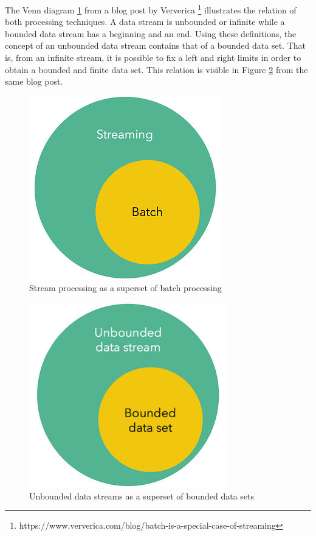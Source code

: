 The Venn diagram \ref{fig:stream-superset} from a blog post by Ververica \footnote{https://www.ververica.com/blog/batch-is-a-special-case-of-streaming} illustrates the relation of both processing techniques. A data stream is unbounded or infinite while a bounded data stream has a beginning and an end. Using these definitions, the concept of an unbounded data stream contains that of a bounded data set. That is, from an infinite stream, it is possible to fix a left and right limits in order to obtain a bounded and finite data set. This relation is visible in Figure \ref{fig:unbounded-bounded-superset} from the same blog post.

\begin{figure}[!htb]
    \begin{center}
      \includegraphics[scale=0.5]{figures/streaming-subset-batch.png}
      \caption{Stream processing as a superset of batch processing}
      \label{fig:stream-superset}
    \end{center}
\end{figure}

\begin{figure}[!htb]
    \begin{center}
      \includegraphics[scale=0.5]{figures/unbounded-superset-bounded.png}
      \caption{Unbounded data streams as a superset of bounded data sets}
      \label{fig:unbounded-bounded-superset}
    \end{center}
\end{figure}



